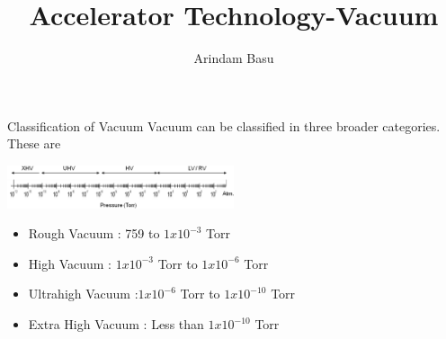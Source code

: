 \documentclass[11]{beamer}
\author{Arindam Basu \hspace{5 cm}\newline{arindam@barc.gov.in}}
\title{Accelerator Technology-Vacuum \newline{Vacuum Introduction Part-1}}
\institute{IADD,BARC}
\begin{document}
\begin{frame}
\titlepage
\end{frame}






\begin{frame}{Classification of Vacuum}
Vacuum can be classified in three broader categories. These are 
\begin{center}
\includegraphics[width=0.5\textwidth]{Vacuum_Scale.png}
\end{center}

\begin{block}{}
	\begin{itemize}
		\item  Rough Vacuum :  759 to $1x 10^{-3}$ Torr
		\item  High Vacuum   :  $1x 10^{-3}$ Torr to $1x 10^{-6}$  Torr
		\item  Ultrahigh Vacuum  :$1x 10^{-6}$  Torr to $1x 10^{-10}$ Torr
		\item  Extra High Vacuum : Less than $1x 10^{-10}$ Torr
	\end{itemize}

\end{block}

\end{frame}





 
\end{document}
